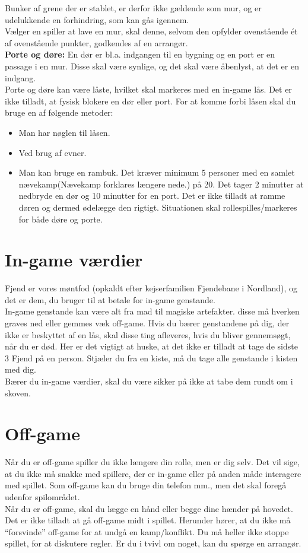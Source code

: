 Bunker af grene der er stablet, er derfor ikke gældende som mur, og er udelukkende en forhindring, som kan gås igennem.\\
Vælger en spiller at lave en mur, skal denne, selvom den opfylder ovenstående ét af ovenstående punkter, godkendes af en arrangør.\\
\textbf{Porte og døre:} En dør er bl.a. indgangen til en bygning og en port er en passage i en mur. Disse skal være synlige, og det skal være åbenlyst, at det er en indgang.\\
Porte og døre kan være låste, hvilket skal markeres med en in-game lås. Det er ikke tilladt, at fysisk blokere en dør eller port. For at komme forbi låsen skal du bruge en af følgende metoder:
\begin{itemize}
    \item Man har nøglen til låsen.
    \item Ved brug af evner.
    \item Man kan bruge en rambuk. Det kræver minimum 5 personer med en samlet nævekamp(Nævekamp forklares længere nede.) på 20. Det tager 2 minutter at nedbryde en dør og 10 minutter for en port. Det er ikke tilladt at ramme døren og dermed ødelægge den rigtigt. Situationen skal rollespilles/markeres for både døre og porte.
\end{itemize}

\section*{In-game værdier}
Fjend er vores møntfod (opkaldt efter kejserfamilien Fjendebane i Nordland), og det er dem, du bruger til at betale for in-game genstande.\\
In-game genstande kan være alt fra mad til magiske artefakter. disse må hverken graves ned eller gemmes væk off-game. Hvis du bærer genstandene på dig, der ikke er beskyttet af en lås, skal disse ting afleveres, hvis du bliver gennemsøgt, når du er død. Her er det vigtigt at huske, at det ikke er tilladt at tage de sidste 3 Fjend på en person. Stjæler du fra en kiste, må du tage alle genstande i kisten med dig.\\
Bærer du in-game værdier, skal du være sikker på ikke at tabe dem rundt om i skoven.

\section*{Off-game}
Når du er off-game spiller du ikke længere din rolle, men er dig selv. Det vil sige, at du ikke må snakke med spillere, der er in-game eller på anden måde interagere med spillet. Som off-game kan du bruge din telefon mm., men det skal foregå udenfor spilområdet.\\
Når du er off-game, skal du lægge en hånd eller begge dine hænder på hovedet. Det er ikke tilladt at gå off-game midt i spillet. Herunder hører, at du ikke må “forsvinde” off-game for at undgå en kamp/konflikt. Du må heller ikke stoppe spillet, for at diskutere regler. Er du i tvivl om noget, kan du spørge en arrangør.

